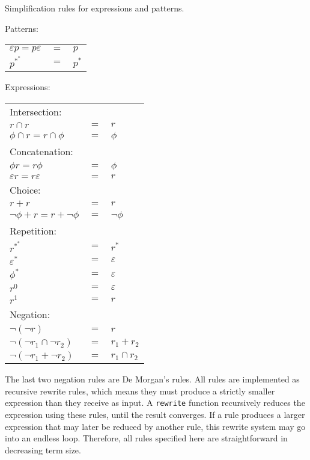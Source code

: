 \begin{defn}
   \label{defn-simplify}
   Simplification rules for expressions and patterns.

   Patterns:

   \begin{tabular}{lrl}
      $\varepsilon p = p \varepsilon$	& $=$	& $p$				\\
      $p^{*^*}$				& $=$	& $p^*$				\\
   \end{tabular}

   Expressions:

   \begin{tabular}{lrl}
      Intersection:								\\
      $r \cap r$			& $=$	& $r$				\\
      $\phi \cap r = r \cap \phi$	& $=$	& $\phi$			\\
      Concatenation:								\\
      $\phi r = r \phi$			& $=$	& $\phi$			\\
      $\varepsilon r = r \varepsilon$	& $=$	& $r$				\\
      Choice:									\\
      $r + r$				& $=$	& $r$				\\
      $\neg\phi + r = r + \neg\phi$	& $=$	& $\neg\phi$			\\
      Repetition:								\\
      $r^{*^*}$				& $=$	& $r^*$				\\
      $\varepsilon^*$			& $=$	& $\varepsilon$			\\
      $\phi^*$				& $=$	& $\varepsilon$			\\
      $r^0$				& $=$	& $\varepsilon$			\\
      $r^1$				& $=$	& $r$				\\
      Negation:									\\
      $\neg(\neg r)$			& $=$	& $r$				\\
      $\neg(\neg r_1 \cap \neg r_2)$	& $=$	& $r_1 + r_2$			\\
      $\neg(\neg r_1 + \neg r_2)$	& $=$	& $r_1 \cap r_2$		\\
   \end{tabular}
\end{defn}

The last two negation rules are De Morgan's rules. All rules are implemented as
recursive rewrite rules, which means they must produce a strictly smaller
expression than they receive as input. A \texttt{rewrite} function recursively
reduces the expression using these rules, until the result converges. If a rule
produces a larger expression that may later be reduced by another rule, this
rewrite system may go into an endless loop. Therefore, all rules specified here
are straightforward in decreasing term size.

